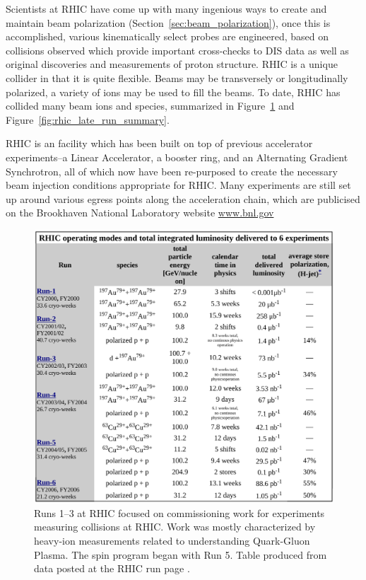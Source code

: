 Scientists at RHIC have come up with many ingenious ways to create and maintain
beam polarization (Section~\ref{sec:beam_polarization}), once this is
accomplished, various kinematically select probes are engineered, based on
collisions observed which provide important cross-checks to DIS data as well as
original discoveries and measurements of proton structure. RHIC is a unique
collider in that it is quite flexible. Beams may be transversely or
longitudinally polarized, a variety of ions may be used to fill the beams. To
date, RHIC has collided many beam ions and species, summarized in
Figure~\ref{fig:rhic_early_run_summary} and
Figure~\ref{fig:rhic_late_run_summary}.

RHIC is an facility which has been built on top of previous accelerator
experiments--a Linear Accelerator, a booster ring, and an Alternating Gradient
Synchrotron, all of which now have been re-purposed to create the necessary beam
injection conditions appropriate for RHIC. Many experiments are still set up
around various egress points along the acceleration chain, which are publicised
on the Brookhaven National Laboratory website \url{www.bnl.gov}

\begin{figure}[ht]
  \centering
  \includegraphics[width=0.8\linewidth]{./figures/rhic_early_run_summary.png}
  \caption{ 
    Runs 1--3 at RHIC focused on commissioning work for experiments measuring
    collisions at RHIC. Work was mostly characterized by heavy-ion measurements
    related to understanding Quark-Gluon Plasma. The spin program began with Run
    5. Table produced from data posted at the RHIC run page \cite{Fischer2016}.
  }
  \label{fig:rhic_early_run_summary}
\end{figure}

